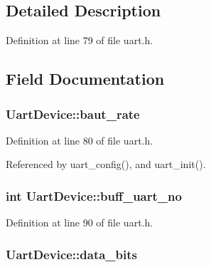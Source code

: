 \subsection{Detailed Description}


Definition at line 79 of file uart.\-h.



\subsection{Field Documentation}
\hypertarget{structUartDevice_a1a6982e54a4c80d03248d97aa4e7f57c}{
\subsubsection[{baut\-\_\-rate}]{ Uart\-Device\-::baut\-\_\-rate}}\label{structUartDevice_a1a6982e54a4c80d03248d97aa4e7f57c}


Definition at line 80 of file uart.\-h.



Referenced by uart\-\_\-config(), and uart\-\_\-init().

\hypertarget{structUartDevice_af828558385d4b66a04288b5d631f0501}{
\subsubsection[{buff\-\_\-uart\-\_\-no}]{\setlength{\rightskip}{0pt plus 5cm}int Uart\-Device\-::buff\-\_\-uart\-\_\-no}}\label{structUartDevice_af828558385d4b66a04288b5d631f0501}


Definition at line 90 of file uart.\-h.

\hypertarget{structUartDevice_ae8f01df67cbdc9fad5e8b66fd03907d6}{
\subsubsection[{data\-\_\-bits}]{ Uart\-Device\-::data\-\_\-bits}}\label{structUartDevice_ae8f01df67cbdc9fad5e8b66fd03907d6}


